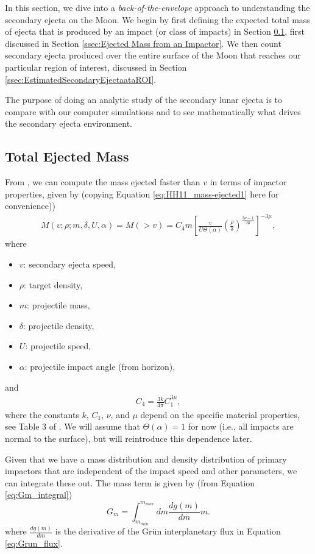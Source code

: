 \documentclass{hitec}
\numberwithin{equation}{section}
\begin{document}
In this section, we dive into a \textit{back-of-the-envelope} approach to understanding the secondary ejecta on the Moon. We begin by first defining the expected total mass of ejecta that is produced by an impact (or class of impacts) in Section \ref{ssec:TotalEjectedMass}, first discussed in Section \ref{ssec:Ejected Mass from an Impactor}. We then count secondary ejecta produced over the entire surface of the Moon that reaches our particular region of interest, discussed in Section \ref{ssec:EstimatedSecondaryEjectaataROI}.

The purpose of doing an analytic study of the secondary lunar ejecta is to compare with our computer simulations and to see mathematically what drives the secondary ejecta environment.

\subsection{Total Ejected Mass}\label{ssec:TotalEjectedMass}
From \cite{housen2011ejecta}, we can compute the mass ejected faster than $v$ in terms of impactor properties, given by (copying Equation \eqref{eq:HH11_mass-ejected1} here for convenience))
\begin{eqnarray}\label{eq:HH11_mass-ejected1-repeat}
M(v; \rho; m, \delta, U, \alpha) = M(>v) = C_4 m\left[\frac{v}{U\Theta(\alpha)}\left(\frac{\rho}{\delta}\right)^{\frac{3\nu-1}{3\mu}}\right]^{-3\mu},
\end{eqnarray}
where
\begin{itemize}
	\item $v$: secondary ejecta speed,
	\item $\rho$: target density,
	\item $m$: projectile mass,
	\item $\delta$: projectile density,
	\item $U$: projectile speed,
	\item $\alpha$: projectile impact angle (from horizon),
\end{itemize}
and
\begin{eqnarray}
C_4 = \frac{3k}{4\pi}C_1^{3\mu},
\end{eqnarray}
where the constants $k$, $C_1$, $\nu$, and $\mu$ depend on the specific material properties, see Table 3 of \cite{housen2011ejecta}. We will assume that $\Theta(\alpha) = 1$ for now (i.e., all impacts are normal to the surface), but will reintroduce this dependence later.

Given that we have a mass distribution and density distribution of primary impactors that are independent of the impact speed and other parameters, we can integrate these out. The mass term is given by (from Equation \eqref{eq:Gm_integral})
\begin{equation}\label{eq:Gm_integral-repeat}
G_m = \int_{m_{min}}^{m_{max}}dm\frac{dg(m)}{dm}m.
\end{equation}
where $\frac{dg(m)}{dm}$ is the derivative of the Gr{\"u}n interplanetary flux in Equation \eqref{eq:Grun_flux}.
\end{document}

